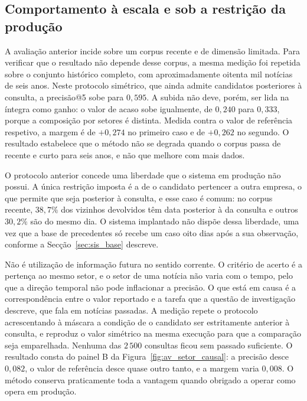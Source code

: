 \subsection{Comportamento à escala e sob a restrição da produção}

A avaliação anterior incide sobre um corpus recente e de dimensão limitada. Para verificar que o
resultado não depende desse corpus, a mesma medição foi repetida sobre o conjunto histórico
completo, com aproximadamente oitenta mil notícias de seis anos. Neste protocolo simétrico, que
ainda admite candidatos posteriores à consulta, a precisão@5 sobe para $0{,}595$. A subida não deve,
porém, ser lida na íntegra como ganho: o valor de acaso sobe igualmente, de $0{,}240$ para $0{,}333$,
porque a composição por setores é distinta. Medida contra o valor de referência respetivo, a margem
é de $+0{,}274$ no primeiro caso e de $+0{,}262$ no segundo. O resultado estabelece que o método não
se degrada quando o corpus passa de recente e curto para seis anos, e não que melhore com mais dados.

O protocolo anterior concede uma liberdade que o sistema em produção não possui. A única restrição
imposta é a de o candidato pertencer a outra empresa, o que permite que seja posterior à consulta, e
esse caso é comum: no corpus recente, $38{,}7\%$ dos vizinhos devolvidos têm data posterior à da
consulta e outros $30{,}2\%$ são do mesmo dia. O sistema implantado não dispõe dessa liberdade, uma
vez que a base de precedentes só recebe um caso oito dias após a sua observação, conforme a
Secção~\ref{sec:sis_base} descreve.

Não é utilização de informação futura no sentido corrente. O critério de acerto é a pertença ao
mesmo setor, e o setor de uma notícia não varia com o tempo, pelo que a direção temporal não pode
inflacionar a precisão. O que está em causa é a correspondência
entre o valor reportado e a tarefa que a questão de investigação descreve, que fala em notícias
passadas. A medição repete o protocolo acrescentando à máscara a condição de o candidato ser
estritamente anterior à consulta, e reproduz o valor simétrico na mesma execução para que a
comparação seja emparelhada. Nenhuma das $2\,500$ consultas ficou sem passado suficiente. O
resultado consta do painel B da Figura~\ref{fig:av_setor_causal}: a precisão desce $0{,}082$, o valor
de referência desce quase outro tanto, e a margem varia $0{,}008$. O método conserva praticamente
toda a vantagem quando obrigado a operar como opera em produção.

